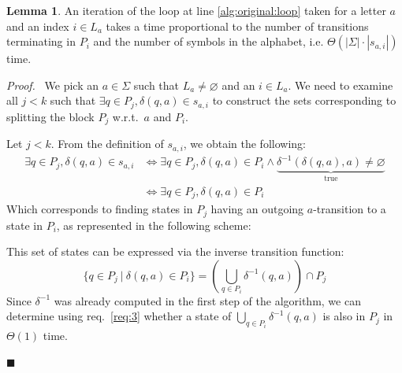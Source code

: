 \documentclass[12pt, a4 paper]{article}
\renewenvironment{proof}[1][Proof]{\begin{mdframed}[backgroundcolor=black!5, topline=false, rightline=false, bottomline=false, linecolor=black!15, linewidth=3pt]{\noindent\textit{#1.}\ }}{\noindent\par\hfill$\blacksquare$\end{mdframed}}
\theoremstyle{definition}
\newtheorem{lemma}{Lemma}
\begin{document}
\begin{lemma}\label{lem:time_iteration}
    An iteration of the loop at line \ref{alg:original:loop} taken for a letter $a$ and an index $i \in L_a$ takes a time proportional to the number of transitions terminating in $P_i$ and the number of symbols in the alphabet, i.e. $\Theta\left(\left| \Sigma \right| \cdot \left| s_{a,i} \right| \right)$ time.
\end{lemma}
\begin{proof}
    We pick an $a \in \Sigma$ such that $L_a \neq \varnothing$ and an $i \in L_a$. We need to examine all $j < k$ such that $\exists q \in P_j, \delta(q, a) \in s_{a,i}$ to construct the sets corresponding to splitting the block $P_j$ w.r.t.\ $a$ and $P_i$.

    Let $j < k$. From the definition of $s_{a,i}$, we obtain the following:
    \begin{align*}
        \exists q \in P_j, \delta(q, a) \in s_{a,i} &\iff \exists q \in P_j, \delta(q, a) \in P_i \land \underset{\text{true}}{\underbrace{\delta^{-1}(\delta(q, a), a) \neq \varnothing}} \\
        & \iff \exists q \in P_j, \delta(q, a) \in P_i
    \end{align*}
    Which corresponds to finding states in $P_j$ having an outgoing $a$-transition to a state in $P_i$, as represented in the following scheme:
    \begin{center}
    \end{center}
    This set of states can be expressed via the inverse transition function:
    $$ \{q \in P_j\ |\ \delta(q,a) \in P_i \} = \left( \bigcup_{q \in P_i} \delta^{-1}(q, a)\right) \cap P_j $$
    Since $\delta^{-1}$ was already computed in the first step of the algorithm, we can determine using req.\ \ref{req:3} whether a state of $\bigcup_{q \in P_i} \delta^{-1}(q, a)$ is also in $P_j$ in $\Theta(1)$ time.
    

\end{proof}
\end{document}
